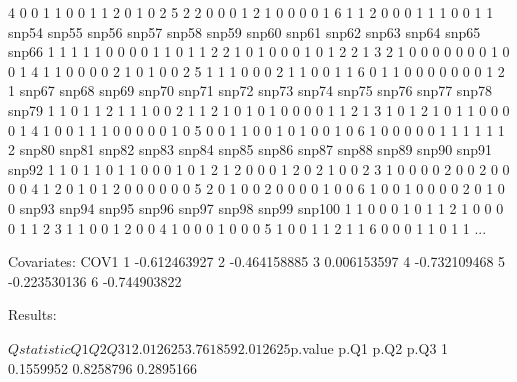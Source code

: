\documentclass{article}
\begin{document}
\begin{Schunk}
\begin{Soutput}
4     0     0     1     1     0     0     1     1     2     0     1     0     2
5     2     2     0     0     0     1     2     1     0     0     0     0     1
6     1     1     2     0     0     0     1     1     1     0     0     1     1
  snp54 snp55 snp56 snp57 snp58 snp59 snp60 snp61 snp62 snp63 snp64 snp65 snp66
1     1     1     1     1     0     0     0     0     1     1     0     1     1
2     2     1     0     1     0     0     0     1     0     1     2     2     1
3     2     1     0     0     0     0     0     0     0     1     0     0     1
4     1     1     0     0     0     0     2     1     0     1     0     0     2
5     1     1     1     0     0     0     2     1     1     0     0     1     1
6     0     1     1     0     0     0     0     0     0     0     1     2     1
  snp67 snp68 snp69 snp70 snp71 snp72 snp73 snp74 snp75 snp76 snp77 snp78 snp79
1     1     0     1     1     2     1     1     1     0     0     2     1     1
2     1     0     1     0     1     0     0     0     0     1     1     2     1
3     1     0     1     2     1     0     1     1     0     0     0     0     1
4     1     0     0     1     1     1     0     0     0     0     0     1     0
5     0     0     1     1     0     0     1     0     1     0     0     1     0
6     1     0     0     0     0     0     1     1     1     1     1     1     2
  snp80 snp81 snp82 snp83 snp84 snp85 snp86 snp87 snp88 snp89 snp90 snp91 snp92
1     1     0     1     1     0     1     1     0     0     0     1     0     1
2     1     2     0     0     0     1     2     0     2     1     0     0     2
3     1     0     0     0     0     2     0     0     2     0     0     0     0
4     1     2     0     1     0     1     2     0     0     0     0     0     0
5     2     0     1     0     0     2     0     0     0     0     1     0     0
6     1     0     0     1     0     0     0     0     2     0     1     0     0
  snp93 snp94 snp95 snp96 snp97 snp98 snp99 snp100
1     1     0     0     0     1     0     1      1
2     1     0     0     0     0     1     1      2
3     1     1     0     0     1     2     0      0
4     1     0     0     0     1     0     0      0
5     1     0     0     1     1     2     1      1
6     0     0     0     1     1     0     1      1
...

Covariates:
          COV1
1 -0.612463927
2 -0.464158885
3  0.006153597
4 -0.732109468
5 -0.223530136
6 -0.744903822


Results:

$Qstatistic
        Q1       Q2       Q3
1 2.012625 3.761859 2.012625

$p.value
       p.Q1      p.Q2      p.Q3
1 0.1559952 0.8258796 0.2895166
\end{Soutput}
\end{Schunk}
\end{document}

